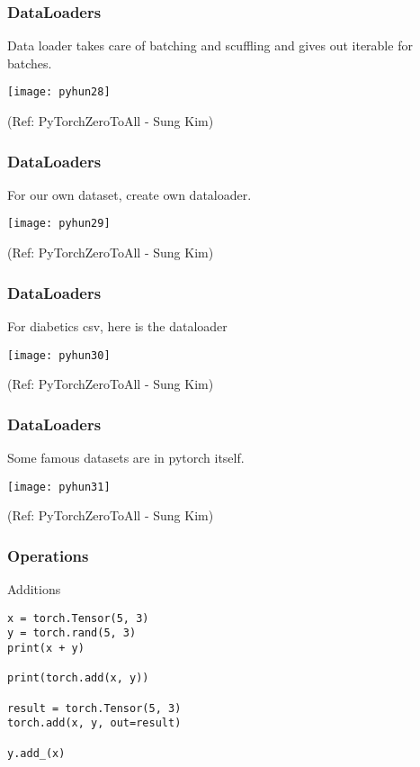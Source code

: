 \begin{frame}[fragile] \frametitle{DataLoaders}
Data loader takes care of batching and scuffling and gives out iterable for batches.
\begin{center}
\texttt{[image: pyhun28]}
\end{center}

\tiny{(Ref: PyTorchZeroToAll  - Sung Kim)}
\end{frame}

\begin{frame}[fragile] \frametitle{DataLoaders}
For our own dataset, create own dataloader.
\begin{center}
\texttt{[image: pyhun29]}
\end{center}

\tiny{(Ref: PyTorchZeroToAll  - Sung Kim)}
\end{frame}

\begin{frame}[fragile] \frametitle{DataLoaders}
For diabetics csv, here is the dataloader
\begin{center}
\texttt{[image: pyhun30]}
\end{center}

\tiny{(Ref: PyTorchZeroToAll  - Sung Kim)}
\end{frame}


\begin{frame}[fragile] \frametitle{DataLoaders}
Some famous datasets are in pytorch itself.
\begin{center}
\texttt{[image: pyhun31]}
\end{center}

\tiny{(Ref: PyTorchZeroToAll  - Sung Kim)}
\end{frame}


\begin{frame}[fragile] \frametitle{Operations}
Additions
\begin{lstlisting}
x = torch.Tensor(5, 3)
y = torch.rand(5, 3)
print(x + y)

print(torch.add(x, y))

result = torch.Tensor(5, 3)
torch.add(x, y, out=result)

y.add_(x)
\end{lstlisting}
\end{frame}

